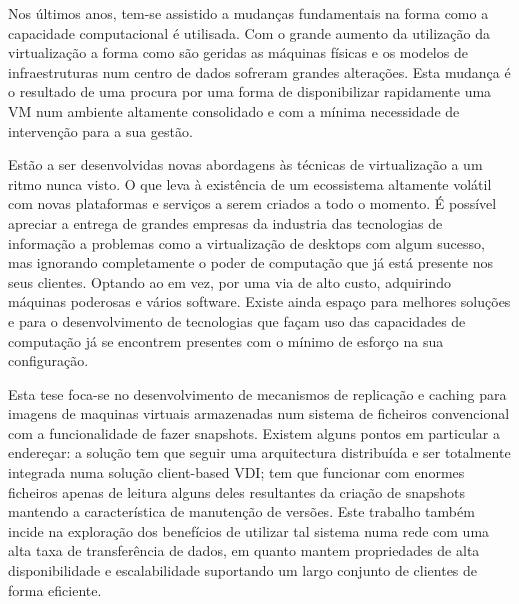 
Nos últimos anos, tem-se assistido a mudanças fundamentais na forma como a capacidade computacional é utilisada. Com o grande aumento da utilização da virtualização a forma como são geridas as máquinas físicas e os modelos de infraestruturas num centro de dados sofreram grandes alterações. Esta mudança é o resultado de uma procura por uma forma de disponibilizar rapidamente uma VM num ambiente altamente consolidado e com a mínima necessidade de intervenção para a sua gestão.

Estão a ser desenvolvidas novas abordagens às técnicas de virtualização a um ritmo nunca visto. O que leva à existência de um ecossistema altamente volátil com novas plataformas e serviços a serem criados a todo o momento. É possível apreciar a entrega de grandes empresas da industria das tecnologias de informação a problemas como a virtualização de desktops com algum sucesso, mas ignorando completamente o poder de computação que já está presente nos seus clientes. Optando ao em vez, por uma via de alto custo, adquirindo máquinas poderosas e vários software. Existe ainda espaço para melhores soluções e para o desenvolvimento de tecnologias que façam uso das capacidades de computação já se encontrem presentes com o mínimo de esforço na sua configuração.

Esta tese foca-se no desenvolvimento de mecanismos de replicação e caching para imagens de maquinas virtuais armazenadas num sistema de ficheiros convencional com a funcionalidade de fazer snapshots. Existem alguns pontos em particular a endereçar: a solução tem que seguir uma arquitectura distribuída e ser totalmente integrada numa solução client-based VDI; tem que funcionar com enormes ficheiros apenas de leitura alguns deles resultantes da criação de snapshots mantendo a característica de manutenção de versões. Este trabalho também incide na exploração dos benefícios de utilizar tal sistema numa rede com uma alta taxa de transferência de dados, em quanto mantem propriedades de alta disponibilidade e escalabilidade suportando um largo conjunto de clientes de forma eficiente.


